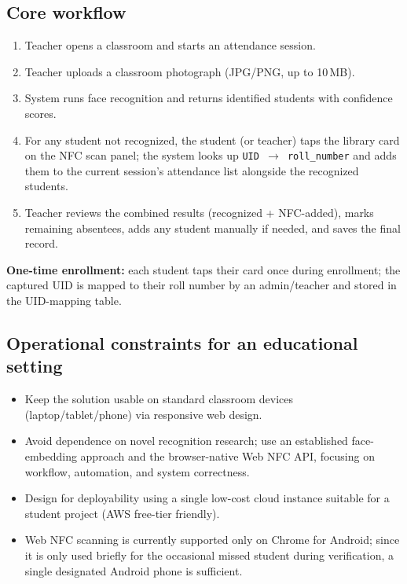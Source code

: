 \documentclass[11pt,a4paper]{article}
\begin{document}
\subsection{Core workflow}
\begin{enumerate}[leftmargin=0.7cm]
    \item Teacher opens a classroom and starts an attendance session.
    \item Teacher uploads a classroom photograph (JPG/PNG, up to 10\,MB).
    \item System runs face recognition and returns identified students with confidence scores.
    \item[3a.] For any student not recognized, the student (or teacher) taps the library card on the NFC scan panel; the system looks up \texttt{UID $\rightarrow$ roll\_number} and adds them to the current session's attendance list alongside the recognized students.
    \item Teacher reviews the combined results (recognized + NFC-added), marks remaining absentees, adds any student manually if needed, and saves the final record.
\end{enumerate}
\textbf{One-time enrollment:} each student taps their card once during
enrollment; the captured UID is mapped to their roll number by an
admin/teacher and stored in the UID-mapping table.

\subsection{Operational constraints for an educational setting}
\begin{itemize}[leftmargin=0.7cm]
    \item Keep the solution usable on standard classroom devices (laptop/tablet/phone) via responsive web design.
    \item Avoid dependence on novel recognition research; use an established face-embedding approach and the browser-native Web NFC API, focusing on workflow, automation, and system correctness.
    \item Design for deployability using a single low-cost cloud instance suitable for a student project (AWS free-tier friendly).
    \item Web NFC scanning is currently supported only on Chrome for Android; since it is only used briefly for the occasional missed student during verification, a single designated Android phone is sufficient.
\end{itemize}
\end{document}
